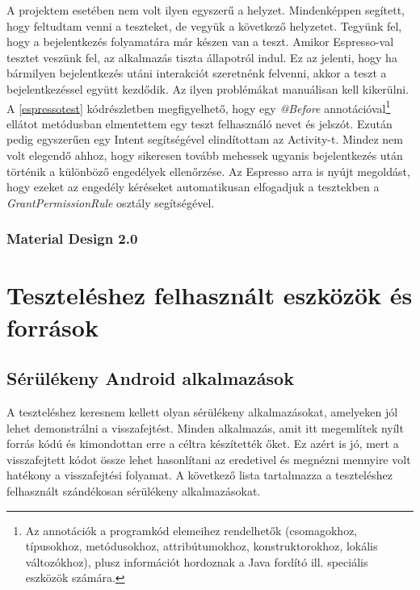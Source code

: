 \documentclass{thesis-ekf}
\theoremstyle{definition}
\theoremstyle{remark}
\begin{document}
A projektem esetében nem volt ilyen egyszerű a helyzet.
Mindenképpen segített, hogy feltudtam venni a teszteket, de vegyük a következő helyzetet.
Tegyünk fel, hogy a bejelentkezés folyamatára már készen van a teszt.
Amikor Espresso-val tesztet veszünk fel, az alkalmazás tiszta állapotról indul.
Ez az jelenti, hogy ha bármilyen bejelentkezés utáni interakciót szeretnénk felvenni, akkor a teszt a bejelentkezéssel együtt kezdődik.
Az ilyen problémákat manuálisan kell kikerülni.
A \ref{espressotest} kódrészletben megfigyelhető, hogy egy \emph{@Before} annotációval\footnote{Az annotációk a programkód elemeihez rendelhetők (csomagokhoz, típusokhoz, metódusokhoz, attribútumokhoz, konstruktorokhoz, lokális változókhoz), plusz információt hordoznak a Java fordító ill. speciális eszközök számára.\cite{annotaciok}} ellátot metódusban elmentettem egy teszt felhasználó nevet és jelszót.
Ezután pedig egyszerűen egy Intent segítségével elindítottam az Activity-t.
Mindez nem volt elegendő ahhoz, hogy sikeresen tovább mehessek ugyanis bejelentkezés után történik a különböző engedélyek ellenőrzése.
Az Espresso arra is nyújt megoldást, hogy ezeket az engedély kéréseket automatikusan elfogadjuk a tesztekben a \emph{GrantPermissionRule} osztály segítségével.



\subsection{Material Design 2.0}

\chapter{Teszteléshez felhasznált eszközök és források}\label{teszteles}

\section{Sérülékeny Android alkalmazások}

A teszteléshez keresnem kellett olyan sérülékeny alkalmazásokat, amelyeken jól lehet demonstrálni a visszafejtést.
Minden alkalmazás, amit itt megemlítek nyílt forrás kódú és kimondottan erre a céltra készítették őket.
Ez azért is jó, mert a visszafejtett kódot össze lehet hasonlítani az eredetivel és megnézni mennyire volt hatékony a visszafejtési folyamat.
A következő lista tartalmazza a teszteléshez felhasznált szándékosan sérülékeny alkalmazásokat.
\end{document}
